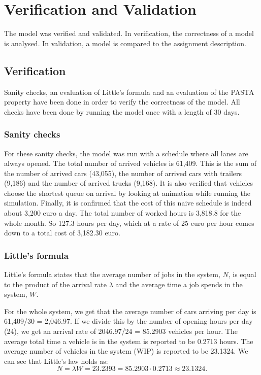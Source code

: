 \section{Verification and Validation}

The model was verified and validated.
In verification, the correctness of a model is analysed. 
In validation, a model is compared to the assignment description.

\subsection{Verification}
Sanity checks, an evaluation of Little's formula and an evaluation of the PASTA property have been done in order to verify the correctness of the model. 
All checks have been done by running the model once with a length of 30 days. 

\subsubsection{Sanity checks}

For these sanity checks, the model was run with a schedule where all lanes are always opened.
The total number of arrived vehicles is 61,409.
This is the sum of the number of arrived cars (43,055), the number of arrived cars with trailers (9,186) and the number of arrived trucks (9,168).
It is also verified that vehicles choose the shortest queue on arrival by looking at animation while running the simulation.
Finally, it is confirmed that the cost of this naive schedule is indeed about 3,200 euro a day. 
The total number of worked hours is 3,818.8 for the whole month. 
So 127.3 hours per day, which at a rate of 25 euro per hour comes down to a total cost of 3,182.30 euro.

\subsubsection{Little's formula}
Little's formula states that the average number of jobs in the system, $N$, is equal to the product of the arrival rate $\lambda$ and the average time a job spends in the system, $W$.

For the whole system, we get that the average number of cars arriving per day is 61,409/30 = 2,046.97. 
If we divide this by the number of opening hours per day (24), we get an arrival rate of 2046.97/24 = 85.2903 vehicles per hour.
The average total time a vehicle is in the system is reported to be 0.2713 hours.
The average number of vehicles in the system (WIP) is reported to be 23.1324.
We can see that Little's law holds as:
$$N=\lambda W = 23.2393 = 85.2903\cdot0.2713 \approx 23.1324.$$

